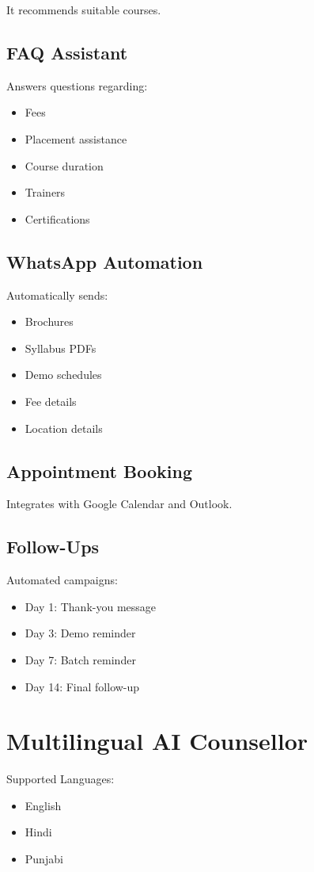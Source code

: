 \documentclass[11pt,a4paper]{article}
\begin{document}
It recommends suitable courses.

\subsection{FAQ Assistant}
Answers questions regarding:
\begin{itemize}
\item Fees
\item Placement assistance
\item Course duration
\item Trainers
\item Certifications
\end{itemize}

\subsection{WhatsApp Automation}
Automatically sends:
\begin{itemize}
\item Brochures
\item Syllabus PDFs
\item Demo schedules
\item Fee details
\item Location details
\end{itemize}

\subsection{Appointment Booking}
Integrates with Google Calendar and Outlook.

\subsection{Follow-Ups}
Automated campaigns:
\begin{itemize}
\item Day 1: Thank-you message
\item Day 3: Demo reminder
\item Day 7: Batch reminder
\item Day 14: Final follow-up
\end{itemize}

\section{Multilingual AI Counsellor}

Supported Languages:
\begin{itemize}
\item English
\item Hindi
\item Punjabi
\end{itemize}
\end{document}
